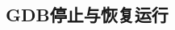 \documentclass[class=book, crop=false]{standalone}
\begin{document}
\begin{CJK}{UTF8}{gbsn}

\chapter{GDB停止与恢复运行}













\cleardoublepage

\end{CJK}
\end{document}
